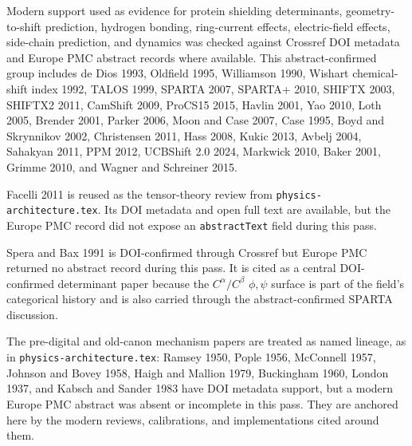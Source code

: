 \documentclass[11pt]{article}
\newcommand{\code}[1]{\texttt{#1}}
\begin{document}
Modern support used as evidence for protein shielding determinants,
geometry-to-shift prediction, hydrogen bonding, ring-current effects,
electric-field effects, side-chain prediction, and dynamics was checked against
Crossref DOI metadata and Europe PMC abstract records where available. This
abstract-confirmed group includes de Dios 1993, Oldfield 1995, Williamson 1990,
Wishart chemical-shift index 1992, TALOS 1999, SPARTA 2007, SPARTA+ 2010,
SHIFTX 2003, SHIFTX2 2011, CamShift 2009, ProCS15 2015, Havlin 2001, Yao
2010, Loth 2005, Brender 2001, Parker 2006, Moon and Case 2007, Case 1995,
Boyd and Skrynnikov 2002, Christensen 2011, Hass 2008, Kukic 2013, Avbelj
2004, Sahakyan 2011, PPM 2012, UCBShift 2.0 2024, Markwick 2010, Baker 2001,
Grimme 2010, and Wagner and Schreiner 2015.

Facelli 2011 is reused as the tensor-theory review from
\code{physics-architecture.tex}. Its DOI metadata and open full text are
available, but the Europe PMC record did not expose an \code{abstractText}
field during this pass.

Spera and Bax 1991 is DOI-confirmed through Crossref but Europe PMC returned no
abstract record during this pass. It is cited as a central DOI-confirmed
determinant paper because the \(C^\alpha/C^\beta\) \(\phi,\psi\) surface is
part of the field's categorical history and is also carried through the
abstract-confirmed SPARTA discussion.

The pre-digital and old-canon mechanism papers are treated as named lineage,
as in \code{physics-architecture.tex}: Ramsey 1950, Pople 1956, McConnell
1957, Johnson and Bovey 1958, Haigh and Mallion 1979, Buckingham 1960, London
1937, and Kabsch and Sander 1983 have DOI metadata support, but a modern Europe
PMC abstract was absent or incomplete in this pass. They are anchored here by
the modern reviews, calibrations, and implementations cited around them.
\end{document}
